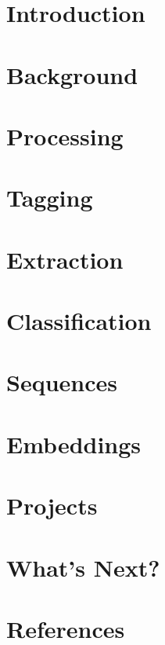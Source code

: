 \section[Intro]{Introduction}



\section[Back]{Background}

\section[Proc]{Processing}

  
 


\section[Tag]{Tagging}





\section[Extr]{Extraction}
 



\section[Class]{Classification}


\section[Seq]{Sequences}



\section[Emb]{Embeddings}


\section[Prj]{Projects}
%  

\section[Next]{What's Next?}



\section[Refs]{References}


